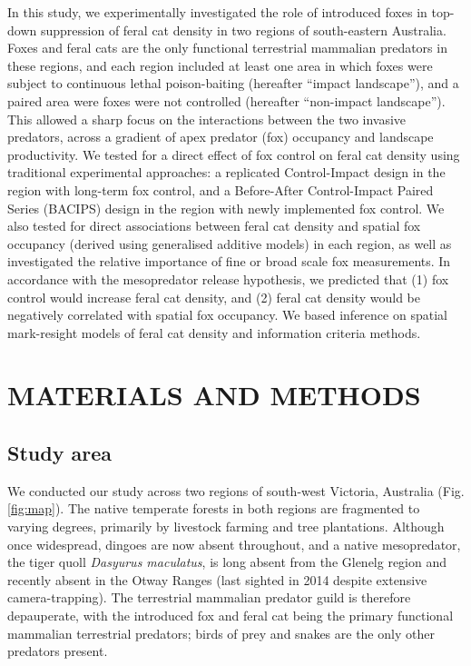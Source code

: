 \documentclass[]{elsarticle} %
\begin{document}
In this study, we experimentally investigated the role of introduced foxes in top-down suppression of feral cat density in two regions of south-eastern Australia.
Foxes and feral cats are the only functional terrestrial mammalian predators in these regions, and each region included at least one area in which foxes were subject to continuous lethal poison-baiting (hereafter ``impact landscape''), and a paired area were foxes were not controlled (hereafter ``non-impact landscape'').
This allowed a sharp focus on the interactions between the two invasive predators, across a gradient of apex predator (fox) occupancy and landscape productivity.
We tested for a direct effect of fox control on feral cat density using traditional experimental approaches: a replicated Control-Impact design in the region with long-term fox control, and a Before-After Control-Impact Paired Series (BACIPS) design in the region with newly implemented fox control.
We also tested for direct associations between feral cat density and spatial fox occupancy (derived using generalised additive models) in each region, as well as investigated the relative importance of fine or broad scale fox measurements.
In accordance with the mesopredator release hypothesis, we predicted that (1) fox control would increase feral cat density, and (2) feral cat density would be negatively correlated with spatial fox occupancy.
We based inference on spatial mark-resight models of feral cat density and information criteria methods.

\newpage

\hypertarget{materials-and-methods}{%
\section{MATERIALS AND METHODS}\label{materials-and-methods}}

\hypertarget{study-area}{%
\subsection{Study area}\label{study-area}}

We conducted our study across two regions of south-west Victoria, Australia (Fig. \ref{fig:map}). The native temperate forests in both regions are fragmented to varying degrees, primarily by livestock farming and tree plantations. Although once widespread, dingoes are now absent throughout, and a native mesopredator, the tiger quoll \emph{Dasyurus maculatus}, is long absent from the Glenelg region and recently absent in the Otway Ranges (last sighted in 2014 despite extensive camera-trapping). The terrestrial mammalian predator guild is therefore depauperate, with the introduced fox and feral cat being the primary functional mammalian terrestrial predators; birds of prey and snakes are the only other predators present.
\end{document}
